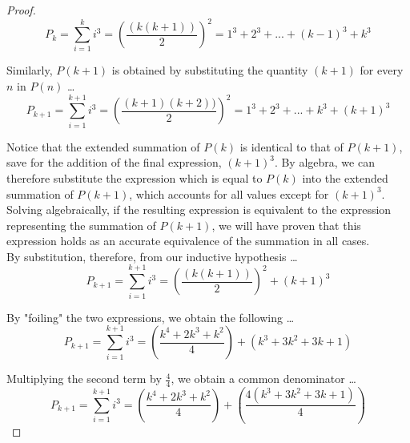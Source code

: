 \documentclass[12pt]{article}
\begin{document}
\begin{proof}
\begin{equation}
P_{k} = \sum_{i = 1}^{k} i^{3} = \left(\frac{(k(k + 1))}{2}\right)^2 = 1^3 + 2^3 + ... + (k - 1)^3 + k^3
\end{equation}
\bigskip

Similarly, $P(k + 1)$ is obtained by substituting the quantity $(k + 1)$ for every $n$ in $P(n)$ \ldots \\

\begin{equation}
P_{k + 1} = \sum_{i = 1}^{k + 1} i^{3} = \left(\frac{(k + 1)(k + 2))}{2}\right)^2 = 1^3 + 2^3 + ... + k^3 + (k + 1)^3
\end{equation}
\bigskip

Notice that the extended summation of $P(k)$ is identical to that of $P(k + 1)$, save for the addition of the final expression, $(k + 1)^3$. By algebra, we can therefore substitute the expression which is equal to $P(k)$ into the extended summation of $P(k + 1)$, which accounts for all values except for $(k + 1)^3$. \\

Solving algebraically, if the resulting expression is equivalent to the expression representing the summation of $P(k + 1)$, we will have proven that this expression holds as an accurate equivalence of the summation in all cases. \\

By substitution, therefore, from our inductive hypothesis \ldots \\

\begin{equation}
P_{k + 1} = \sum_{i = 1}^{k + 1} i^{3} = \left(\frac{(k(k + 1))}{2}\right)^2 + (k + 1)^3
\end{equation}
\bigskip

By "foiling" the two expressions, we obtain the following \ldots \\

\begin{equation}
P_{k + 1} = \sum_{i = 1}^{k + 1} i^{3} = \left(\frac{k^4 + 2k^3 + k^2}{4}\right) + (k^3 + 3k^2 + 3k + 1)
\end{equation}
\bigskip

Multiplying the second term by $\frac{4}{4}$, we obtain a common denominator \ldots \\

\begin{equation}
P_{k + 1} = \sum_{i = 1}^{k + 1} i^{3} = \left(\frac{k^4 + 2k^3 + k^2}{4}\right) + \left(\frac{4(k^3 + 3k^2 + 3k + 1)}{4}\right)
\end{equation}
\bigskip


\end{proof}
\end{document}
